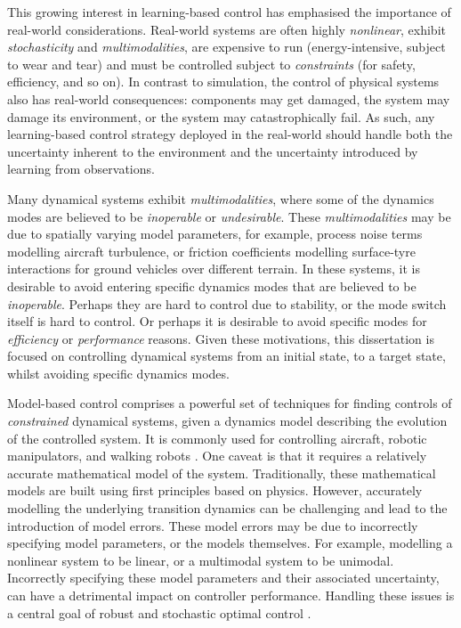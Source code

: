 \documentclass{mimosis-class/mimosis}
\numberwithin{equation}{chapter}
\begin{document}
This growing interest in learning-based control
has emphasised the importance of real-world considerations.
Real-world systems are often highly \emph{nonlinear}, exhibit \emph{stochasticity} and \emph{multimodalities},
are expensive to run (energy-intensive, subject to wear and tear) and
must be controlled subject to \emph{constraints} (for safety, efficiency, and so on).
In contrast to simulation, the control of physical systems also has real-world consequences:
components may get damaged, the system may damage its environment, or the system may catastrophically fail.
As such, any learning-based control strategy deployed in the real-world should handle both the uncertainty inherent
to the environment and the uncertainty introduced by learning from observations.

Many dynamical systems exhibit \emph{multimodalities}, where some of the dynamics modes
are believed to be \emph{inoperable} or \emph{undesirable}.
These \emph{multimodalities} may be due to spatially varying model parameters, for example,
process noise terms modelling aircraft turbulence, or friction coefficients modelling
surface-tyre interactions for ground vehicles over different terrain.
In these systems, it is desirable to avoid entering specific dynamics modes that are believed to be \emph{inoperable}.
Perhaps they are hard to control due to stability, or the mode switch itself is hard to control.
Or perhaps it is desirable to avoid specific modes for \emph{efficiency} or \emph{performance} reasons.
Given these motivations, this dissertation is focused on controlling dynamical systems from an initial state,
to a target state, whilst avoiding specific dynamics modes.

Model-based control comprises a powerful set of techniques for finding controls of \emph{constrained} dynamical
systems, given a dynamics model describing the evolution of the controlled system.
It is commonly used for controlling aircraft, robotic manipulators, and walking
robots \citep{vonstrykDirect1992,bettsSurvey1998,gargUnified2010}.
One caveat is that it requires a relatively accurate mathematical model of the system.
Traditionally, these mathematical models are built using first principles based on physics.
However, accurately modelling the underlying transition dynamics can be challenging and
lead to the introduction of model errors.
These model errors may be due to incorrectly specifying model parameters, or the
models themselves.
For example, modelling a nonlinear system to be linear, or a multimodal system to be unimodal.
Incorrectly specifying these model parameters and their associated uncertainty,
can have a detrimental impact on controller performance.
Handling these issues is a central goal of robust and stochastic optimal
control \citep{freemanRobust1996,stengelStochastic1986}.
\end{document}
